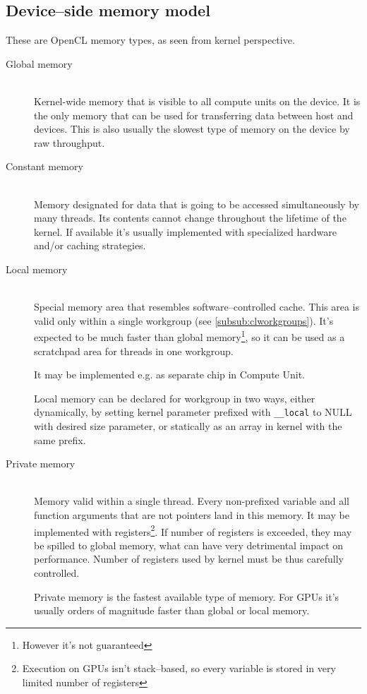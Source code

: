 \subsection{Device--side memory model}

These are OpenCL memory types, as seen from kernel perspective.

\begin{description}
  \item[Global memory] \hfill \\
    Kernel-wide memory that is visible to all compute units on the device.
    It is the only memory that can be used for transferring data between host and
    devices. This is also usually the slowest type of memory on the device by raw
    throughput.
    \pagebreak
  \item[Constant memory] \hfill \\
    Memory designated for data that is going to be accessed simultaneously by
    many threads. Its contents cannot change throughout the lifetime of the
    kernel. If available it's usually implemented with specialized hardware
    and/or caching strategies.
  \item[Local memory] \hfill \\
    Special memory area that resembles software--controlled cache. This area is
    valid only within a single workgroup (see \autoref{subsub:clworkgroups}). It's
    expected to be much faster than global memory\footnote{However it's not guaranteed},
    so it can be used as a scratchpad area for threads in one workgroup.

    It may be implemented e.g. as separate chip in Compute Unit.

    Local memory can be declared for workgroup in two ways, either dynamically,
    by setting kernel parameter prefixed with \texttt{\_\_local} to NULL with
    desired size parameter, or statically as an array in kernel with the same
    prefix.

  \item[Private memory] \hfill \\
    Memory valid within a single thread. Every non-prefixed variable and all function
    arguments that are not pointers land in this memory. It may be implemented
    with registers\footnote{Execution on GPUs isn't stack--based, so every variable
    is stored in very limited number of registers}. If number of registers is
    exceeded, they may be spilled to global memory, what can have very
    detrimental impact on performance. Number of registers used by kernel must
    be thus carefully controlled.

    Private memory is the fastest available type of memory. For GPUs it's usually
    orders of magnitude faster than global or local memory.
\end{description}

